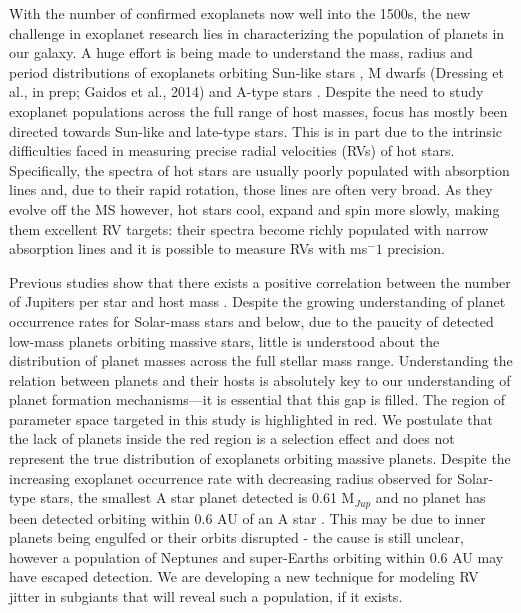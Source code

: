 \documentclass[useAMS, usenatbib]{aastex}
\begin{document}

With the number of confirmed exoplanets now well into the 1500s, the new
challenge in exoplanet research lies in characterizing the population of
planets in our galaxy.
A huge effort is being made to understand the mass, radius and period
distributions of exoplanets orbiting Sun-like stars
\citep[e.g.][]{Butler2006, Howard2010, Petigura2013, Foreman-Mackey2014},
M dwarfs (Dressing et al., in prep; Gaidos et al., 2014) and A-type stars
\citep{Johnson2010a}.
Despite the need to study exoplanet populations across the full range of host
masses, focus has mostly been directed towards Sun-like and late-type stars.
This is in part due to the intrinsic difficulties faced in measuring precise
radial velocities (RVs) of hot stars.
Specifically, the spectra of hot stars are usually poorly populated with
absorption lines and, due to their rapid rotation, those lines are often very
broad.
As they evolve off the MS however, hot stars cool, expand and spin more
slowly, making them excellent RV targets: their spectra become richly
populated with narrow absorption lines and it is possible to measure RVs with
ms$^-1$ precision.

Previous studies show that there exists a positive correlation between the
number of Jupiters per star and host mass \citep{Johnson2010a, Bowler2010,
Lovis2007}.
Despite the growing understanding of planet occurrence rates for Solar-mass
stars and below, due to the paucity of
detected low-mass planets orbiting massive stars, little is understood about
the distribution of planet masses across the full stellar mass range.
Understanding the relation between planets and their hosts is absolutely key
to our understanding of planet formation mechanisms---it is essential that
this gap is filled.
The region of parameter space targeted in this study is highlighted in red.
We postulate that the lack of planets inside the red region is a selection
effect and does not represent the true distribution of exoplanets orbiting
massive planets.
Despite the increasing exoplanet occurrence rate with decreasing radius
observed for Solar-type stars, the smallest A star planet detected is 0.61
M$_{Jup}$ and no planet has been detected orbiting within 0.6 AU of an A star
\citep{Johnson2007}.
This may be due to inner planets being engulfed or their orbits
disrupted - the cause is still unclear, however a population of Neptunes and
super-Earths orbiting within 0.6 AU may have escaped detection.
We are developing a new technique for modeling RV jitter in subgiants that will
reveal such a population, if it exists.
\end{document}
